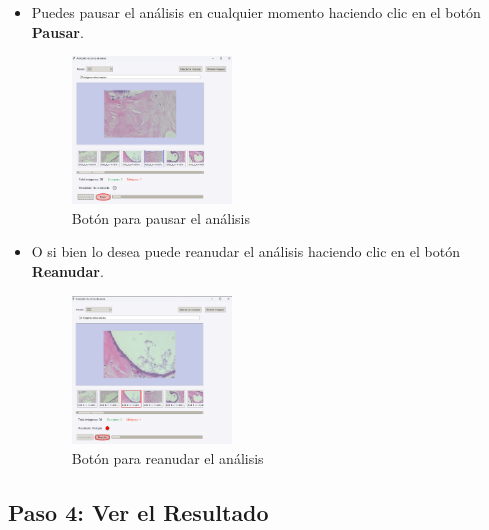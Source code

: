 \documentclass[12pt]{article} %
\begin{document}
\begin{itemize}
    \item Puedes pausar el análisis en cualquier momento haciendo clic en el botón \textbf{Pausar}.
    \begin{figure}[!ht]
        \centering
        \includegraphics[width=0.4\textwidth]{PausarAnalisis.png}
        \caption{Botón para pausar el análisis}
        \label{fig:pausar_analisis}
    \end{figure}
    \item O si bien lo desea puede reanudar el análisis haciendo clic en el botón \textbf{Reanudar}.
    \begin{figure}[!ht]
        \centering
        \includegraphics[width=0.4\textwidth]{ReanudarAnalisis.png}
        \caption{Botón para reanudar el análisis}
        \label{fig:reanudar_analisis}
    \end{figure}
\end{itemize}

\subsection*{Paso 4: Ver el Resultado}
\end{document}
